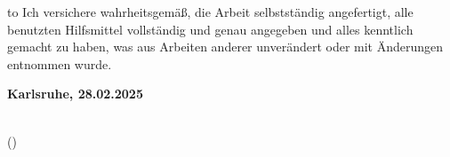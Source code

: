 
\thispagestyle{empty}
\null\vfill
\noindent\hbox to \textwidth{\hrulefill} 
%
{Ich versichere wahrheitsgemäß, die Arbeit
selbstständig angefertigt, alle benutzten Hilfsmittel vollständig und genau
angegeben und alles kenntlich gemacht zu haben, was aus Arbeiten anderer
unverändert oder mit Änderungen entnommen wurde.}
 
 
\textbf{Karlsruhe, 28.02.2025}
\vspace{1.5cm}
 
\dotfill\hspace*{6.0cm}\\
\hspace*{1cm}(\theauthor) 
\cleardoublepage